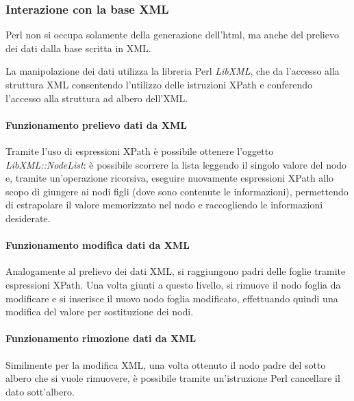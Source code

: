 \subsubsection{Interazione con la base XML}
Perl non si occupa solamente della generazione dell'html, ma anche del prelievo dei dati dalla base scritta in XML.

La manipolazione dei dati utilizza la libreria Perl \textit{LibXML}, che da l'accesso alla struttura XML consentendo l'utilizzo delle istruzioni XPath e conferendo l'accesso alla struttura ad albero dell'XML.

\paragraph*{Funzionamento prelievo dati da XML}Tramite l'uso di espressioni XPath \`e possibile ottenere l'oggetto \textit{LibXML::NodeList}: \`e possibile scorrere la lista leggendo il singolo valore del nodo e, tramite un'operazione ricorsiva, eseguire nuovamente espressioni XPath allo scopo di giungere ai nodi figli (dove sono contenute le informazioni), permettendo di estrapolare il valore memorizzato nel nodo e raccogliendo le informazioni desiderate.

\paragraph*{Funzionamento modifica dati da XML}Analogamente al prelievo dei dati XML, si raggiungono padri delle foglie tramite espressioni XPath. Una volta giunti a questo livello, si rimuove il nodo foglia da modificare e si inserisce il nuovo nodo foglia modificato, effettuando quindi una modifica del valore per sostituzione dei nodi.

\paragraph*{Funzionamento rimozione dati da XML}Similmente per la modifica XML, una volta ottenuto il nodo padre del sotto albero che si vuole rimuovere, \`e possibile tramite un'istruzione Perl cancellare il dato sott'albero.


